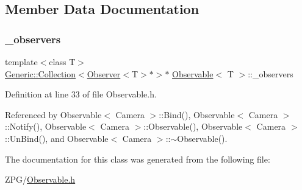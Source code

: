 \subsection{Member Data Documentation}
\mbox{\label{classObservable_ae6028589035c86e8a9c4375306dca702}} 
\subsubsection{\texorpdfstring{\+\_\+observers}{\_observers}}
{\footnotesize\ttfamily template$<$class T$>$ \\
\mbox{\hyperlink{classGeneric_1_1Collection}{Generic\+::\+Collection}}$<$\mbox{\hyperlink{classObserver}{Observer}}$<$T$>$$\ast$$>$$\ast$ \mbox{\hyperlink{classObservable}{Observable}}$<$ T $>$\+::\+\_\+observers\hspace{0.3cm}{\ttfamily [private]}}



Definition at line 33 of file Observable.\+h.



Referenced by Observable$<$ Camera $>$\+::\+Bind(), Observable$<$ Camera $>$\+::\+Notify(), Observable$<$ Camera $>$\+::\+Observable(), Observable$<$ Camera $>$\+::\+Un\+Bind(), and Observable$<$ Camera $>$\+::$\sim$\+Observable().



The documentation for this class was generated from the following file\+:\begin{DoxyCompactItemize}
\item 
Z\+P\+G/\mbox{\hyperlink{Observable_8h}{Observable.\+h}}\end{DoxyCompactItemize}
